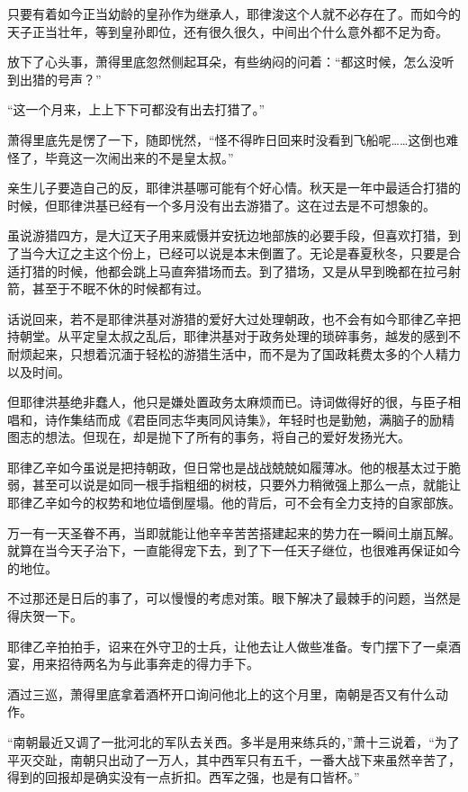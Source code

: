 只要有着如今正当幼龄的皇孙作为继承人，耶律浚这个人就不必存在了。而如今的天子正当壮年，等到皇孙即位，还有很久很久，中间出个什么意外都不足为奇。

放下了心头事，萧得里底忽然侧起耳朵，有些纳闷的问着：“都这时候，怎么没听到出猎的号声？”

“这一个月来，上上下下可都没有出去打猎了。”

萧得里底先是愣了一下，随即恍然，“怪不得昨日回来时没看到飞船呢……这倒也难怪了，毕竟这一次闹出来的不是皇太叔。”

亲生儿子要造自己的反，耶律洪基哪可能有个好心情。秋天是一年中最适合打猎的时候，但耶律洪基已经有一个多月没有出去游猎了。这在过去是不可想象的。

虽说游猎四方，是大辽天子用来威慑并安抚边地部族的必要手段，但喜欢打猎，到了当今大辽之主这个份上，已经可以说是本末倒置了。无论是春夏秋冬，只要是合适打猎的时候，他都会跳上马直奔猎场而去。到了猎场，又是从早到晚都在拉弓射箭，甚至于不眠不休的时候都有过。

话说回来，若不是耶律洪基对游猎的爱好大过处理朝政，也不会有如今耶律乙辛把持朝堂。从平定皇太叔之乱后，耶律洪基对于政务处理的琐碎事务，越发的感到不耐烦起来，只想着沉湎于轻松的游猎生活中，而不是为了国政耗费太多的个人精力以及时间。

但耶律洪基绝非蠢人，他只是嫌处置政务太麻烦而已。诗词做得好的很，与臣子相唱和，诗作集结而成《君臣同志华夷同风诗集》，年轻时也是勤勉，满脑子的励精图志的想法。但现在，却是抛下了所有的事务，将自己的爱好发扬光大。

耶律乙辛如今虽说是把持朝政，但日常也是战战兢兢如履薄冰。他的根基太过于脆弱，甚至可以说是如同一根手指粗细的树枝，只要外力稍微强上那么一点，就能让耶律乙辛如今的权势和地位墙倒屋塌。他的背后，可不会有全力支持的自家部族。

万一有一天圣眷不再，当即就能让他辛辛苦苦搭建起来的势力在一瞬间土崩瓦解。就算在当今天子治下，一直能得宠下去，到了下一任天子继位，也很难再保证如今的地位。

不过那还是日后的事了，可以慢慢的考虑对策。眼下解决了最棘手的问题，当然是得庆贺一下。

耶律乙辛拍拍手，诏来在外守卫的士兵，让他去让人做些准备。专门摆下了一桌酒宴，用来招待两名为与此事奔走的得力手下。

酒过三巡，萧得里底拿着酒杯开口询问他北上的这个月里，南朝是否又有什么动作。

“南朝最近又调了一批河北的军队去关西。多半是用来练兵的，”萧十三说着，“为了平灭交趾，南朝只出动了一万人，其中西军只有五千，一番大战下来虽然辛苦了，得到的回报却是确实没有一点折扣。西军之强，也是有口皆杯。”

